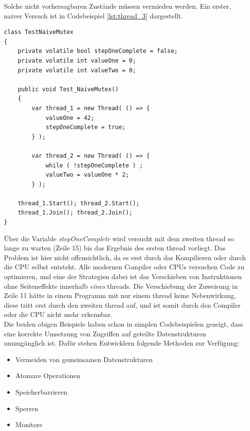 Solche nicht vorhersagbaren Zustände müssen vermieden werden. Ein erster, naiver Versuch ist in Codebeispiel \ref{lst:thread_3} dargestellt.\parencite[S. 180]{Dahlin2012}
\begin{lstlisting}[caption={Thread naiver Mutex},label={lst:thread_3},captionpos=b]
class TestNaiveMutex
{
    private volatile bool stepOneComplete = false;
	private volatile int valueOne = 0;
	private volatile int valueTwo = 0;

	public void Test_NaiveMutex()
	{
		var thread_1 = new Thread( () => {
			valueOne = 42;
			stepOneComplete = true;
		} );

		var thread_2 = new Thread( () => {
			while ( !stepOneComplete ) ;
			valueTwo = valueOne * 2;
		} );

	thread_1.Start(); thread_2.Start();
	thread_1.Join(); thread_2.Join();
}
\end{lstlisting}
Über die Variable \textit{stepOneComplete} wird versucht mit dem zweiten thread so lange zu warten (Zeile 15) bis das Ergebnis des ersten thread vorliegt. Das Problem ist hier nicht offensichtlich, da es erst durch das Kompilieren oder durch die CPU selbst entsteht. Alle modernen Compiler oder CPUs versuchen Code zu optimieren, und eine der Strategien dabei ist das Verschieben von Instruktionen ohne Seiteneffekte innerhalb \textit{eines} threads\parencite[S. 100]{ecma335}. Die Verschiebung der Zuweisung in Zeile 11 hätte in einem Programm mit nur einem thread keine Nebenwirkung, diese tritt erst durch den zweiten thread auf, und ist somit durch den Compiler oder die CPU nicht mehr erkennbar.
\\Die beiden obigen Beispiele haben schon in simplen Codebeispielen gezeigt, dass eine korrekte Umsetzung von Zugriffen auf geteilte Datenstrukturen unumgänglich ist. Dafür stehen Entwicklern folgende Methoden zur Verfügung\parencite[S. 170ff]{tanenbaum2016}:
\begin{itemize}
	\item Vermeiden von gemeinsamen Datenstrukturen
	\item Atomare Operationen
	\item Speicherbarrieren
	\item Sperren
	\item Monitore
\end{itemize}
